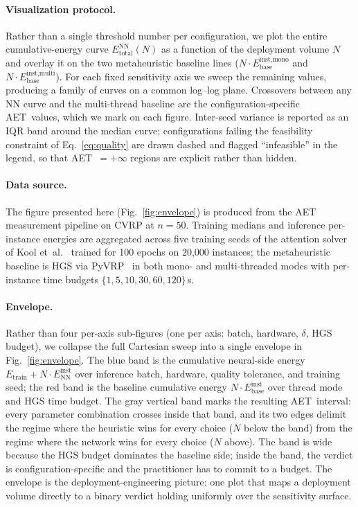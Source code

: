 \documentclass[11pt]{article}
\newcommand{\AET}{AET}
\begin{document}
\paragraph{Visualization protocol.} Rather than a single threshold
number per configuration, we plot the entire cumulative-energy curve \(E_\text{total}^\text{NN}(N)\) as a function of the deployment volume \(N\) and overlay it on the two metaheuristic baseline lines (\(N \cdot E_\text{base}^\text{inst,mono}\) and \(N \cdot E_\text{base}^\text{inst,multi}\)). For each fixed sensitivity axis we sweep the remaining values, producing a family of curves on a common log--log plane. Crossovers between any NN curve and the multi-thread baseline are the configuration-specific \AET\ values, which we mark on each figure. Inter-seed variance is reported as an IQR band around the median curve; configurations failing the feasibility constraint of Eq.~\eqref{eq:quality} are drawn dashed and flagged ``infeasible'' in the legend, so that \AET\ \(= +\infty\) regions are explicit rather than hidden.

\paragraph{Data source.} The figure presented here (Fig.~\ref{fig:envelope}) is produced from the AET measurement pipeline on CVRP at \(n=50\). Training medians and inference per-instance energies are aggregated across five training seeds of the attention solver of Kool et~al.~\cite{kool2019attention} trained for 100 epochs on 20{,}000 instances; the metaheuristic baseline is HGS via PyVRP~\cite{vidal2022hgs,wouda2024pyvrp} in both mono- and multi-threaded modes with per-instance time budgets \(\{1, 5, 10, 30, 60, 120\}\)\,s.

\paragraph{Envelope.} Rather than four per-axis sub-figures (one per axis: batch, hardware, \(\delta\), HGS budget), we collapse the full Cartesian sweep into a single envelope in Fig.~\ref{fig:envelope}. The blue band is the cumulative neural-side energy \(E_\text{train} + N \cdot E_\text{NN}^\text{inst}\) over inference batch, hardware, quality tolerance, and training seed; the red band is the baseline cumulative energy \(N \cdot E_\text{base}^\text{inst}\) over thread mode and HGS time budget. The gray vertical band marks the resulting \AET\ interval: every parameter combination crosses inside that band, and its two edges delimit the regime where the heuristic wins for every choice (\(N\) below the band) from the regime where the network wins for every choice (\(N\) above). The band is wide because the HGS budget dominates the baseline side; inside the band, the verdict is configuration-specific and the practitioner has to commit to a budget. The envelope is the deployment-engineering picture: one plot that maps a deployment volume directly to a binary verdict holding uniformly over the sensitivity surface.
\end{document}

